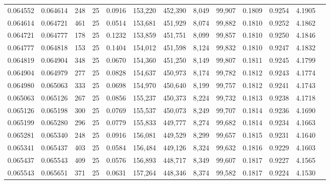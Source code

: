 \begin{tabular}{rrrrrrrrrrrrr}
0.064552 & 0.064614 &   248 &  25 &                                     0.0916 & 153,220 & 452,390 &   8,049 &  99,907 & 0.1809 & 0.9254 & 4.1905 \\
0.064614 & 0.064721 &   461 &  25 &                                     0.0514 & 153,681 & 451,929 &   8,074 &  99,882 & 0.1810 & 0.9252 & 4.1862 \\
0.064721 & 0.064777 &   178 &  25 &                                     0.1232 & 153,859 & 451,751 &   8,099 &  99,857 & 0.1810 & 0.9250 & 4.1846 \\
0.064777 & 0.064818 &   153 &  25 &                                     0.1404 & 154,012 & 451,598 &   8,124 &  99,832 & 0.1810 & 0.9247 & 4.1832 \\
0.064819 & 0.064904 &   348 &  25 &                                     0.0670 & 154,360 & 451,250 &   8,149 &  99,807 & 0.1811 & 0.9245 & 4.1799 \\
0.064904 & 0.064979 &   277 &  25 &                                     0.0828 & 154,637 & 450,973 &   8,174 &  99,782 & 0.1812 & 0.9243 & 4.1774 \\
0.064980 & 0.065063 &   333 &  25 &                                     0.0698 & 154,970 & 450,640 &   8,199 &  99,757 & 0.1812 & 0.9241 & 4.1743 \\
0.065063 & 0.065126 &   267 &  25 &                                     0.0856 & 155,237 & 450,373 &   8,224 &  99,732 & 0.1813 & 0.9238 & 4.1718 \\
0.065126 & 0.065198 &   300 &  25 &                                     0.0769 & 155,537 & 450,073 &   8,249 &  99,707 & 0.1814 & 0.9236 & 4.1690 \\
0.065199 & 0.065280 &   296 &  25 &                                     0.0779 & 155,833 & 449,777 &   8,274 &  99,682 & 0.1814 & 0.9234 & 4.1663 \\
0.065281 & 0.065340 &   248 &  25 &                                     0.0916 & 156,081 & 449,529 &   8,299 &  99,657 & 0.1815 & 0.9231 & 4.1640 \\
0.065341 & 0.065437 &   403 &  25 &                                     0.0584 & 156,484 & 449,126 &   8,324 &  99,632 & 0.1816 & 0.9229 & 4.1603 \\
0.065437 & 0.065543 &   409 &  25 &                                     0.0576 & 156,893 & 448,717 &   8,349 &  99,607 & 0.1817 & 0.9227 & 4.1565 \\
0.065543 & 0.065651 &   371 &  25 &                                     0.0631 & 157,264 & 448,346 &   8,374 &  99,582 & 0.1817 & 0.9224 & 4.1530 \\

\end{tabular}
